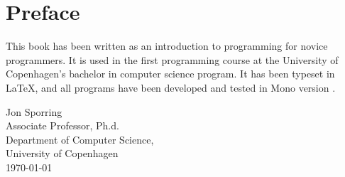 \documentclass[fsharpnotes.tex]{subfiles}
\begin{document}
\chapter{Preface}
This book has been written as an introduction to programming for novice programmers. It is used in the first programming course at the University of Copenhagen's bachelor in computer science program. It has been typeset in \LaTeX, and all programs have been developed and tested in Mono version \monoVersion.


\vspace*{1cm}
Jon Sporring\\
Associate Professor, Ph.d.\\
Department of Computer Science,\\
University of Copenhagen\\
\today\\
\end{document}
